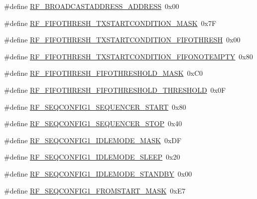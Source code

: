 \begin{DoxyCompactItemize}
\item 
\#define \hyperlink{sx1276Regs-Fsk_8h_a6fe83305d4e9adead59e7783120b0ee5}{R\+F\+\_\+\+B\+R\+O\+A\+D\+C\+A\+S\+T\+A\+D\+D\+R\+E\+S\+S\+\_\+\+A\+D\+D\+R\+E\+SS}~0x00
\item 
\#define \hyperlink{sx1276Regs-Fsk_8h_af0bc1b4471a1dbd9d6e11895fe34d154}{R\+F\+\_\+\+F\+I\+F\+O\+T\+H\+R\+E\+S\+H\+\_\+\+T\+X\+S\+T\+A\+R\+T\+C\+O\+N\+D\+I\+T\+I\+O\+N\+\_\+\+M\+A\+SK}~0x7F
\item 
\#define \hyperlink{sx1276Regs-Fsk_8h_aa6ad7e18fef56fd59458fd8b7e723b14}{R\+F\+\_\+\+F\+I\+F\+O\+T\+H\+R\+E\+S\+H\+\_\+\+T\+X\+S\+T\+A\+R\+T\+C\+O\+N\+D\+I\+T\+I\+O\+N\+\_\+\+F\+I\+F\+O\+T\+H\+R\+E\+SH}~0x00
\item 
\#define \hyperlink{sx1276Regs-Fsk_8h_a25f3a10051bb160b646cbc8f05b99bf8}{R\+F\+\_\+\+F\+I\+F\+O\+T\+H\+R\+E\+S\+H\+\_\+\+T\+X\+S\+T\+A\+R\+T\+C\+O\+N\+D\+I\+T\+I\+O\+N\+\_\+\+F\+I\+F\+O\+N\+O\+T\+E\+M\+P\+TY}~0x80
\item 
\#define \hyperlink{sx1276Regs-Fsk_8h_a11133eab9006138c972b4bbbbcc38ef9}{R\+F\+\_\+\+F\+I\+F\+O\+T\+H\+R\+E\+S\+H\+\_\+\+F\+I\+F\+O\+T\+H\+R\+E\+S\+H\+O\+L\+D\+\_\+\+M\+A\+SK}~0x\+C0
\item 
\#define \hyperlink{sx1276Regs-Fsk_8h_a157d89bed834c9fe81aa8b0a653526c3}{R\+F\+\_\+\+F\+I\+F\+O\+T\+H\+R\+E\+S\+H\+\_\+\+F\+I\+F\+O\+T\+H\+R\+E\+S\+H\+O\+L\+D\+\_\+\+T\+H\+R\+E\+S\+H\+O\+LD}~0x0F
\item 
\#define \hyperlink{sx1276Regs-Fsk_8h_a9374284f8d161876adbfe106d58dd77d}{R\+F\+\_\+\+S\+E\+Q\+C\+O\+N\+F\+I\+G1\+\_\+\+S\+E\+Q\+U\+E\+N\+C\+E\+R\+\_\+\+S\+T\+A\+RT}~0x80
\item 
\#define \hyperlink{sx1276Regs-Fsk_8h_a77b3c19d8d12e5acfe979ab731df8a06}{R\+F\+\_\+\+S\+E\+Q\+C\+O\+N\+F\+I\+G1\+\_\+\+S\+E\+Q\+U\+E\+N\+C\+E\+R\+\_\+\+S\+T\+OP}~0x40
\item 
\#define \hyperlink{sx1276Regs-Fsk_8h_af2acf1e69aca7c8fcd98b364903512c8}{R\+F\+\_\+\+S\+E\+Q\+C\+O\+N\+F\+I\+G1\+\_\+\+I\+D\+L\+E\+M\+O\+D\+E\+\_\+\+M\+A\+SK}~0x\+DF
\item 
\#define \hyperlink{sx1276Regs-Fsk_8h_aeb8f9f145245df6d737b93f2d26cdc3a}{R\+F\+\_\+\+S\+E\+Q\+C\+O\+N\+F\+I\+G1\+\_\+\+I\+D\+L\+E\+M\+O\+D\+E\+\_\+\+S\+L\+E\+EP}~0x20
\item 
\#define \hyperlink{sx1276Regs-Fsk_8h_a4994de24c1c0ada3cba71f4cb9ff91db}{R\+F\+\_\+\+S\+E\+Q\+C\+O\+N\+F\+I\+G1\+\_\+\+I\+D\+L\+E\+M\+O\+D\+E\+\_\+\+S\+T\+A\+N\+D\+BY}~0x00
\item 
\#define \hyperlink{sx1276Regs-Fsk_8h_a842ad530378141c3522950f4ed4a6278}{R\+F\+\_\+\+S\+E\+Q\+C\+O\+N\+F\+I\+G1\+\_\+\+F\+R\+O\+M\+S\+T\+A\+R\+T\+\_\+\+M\+A\+SK}~0x\+E7

\end{DoxyCompactItemize}
